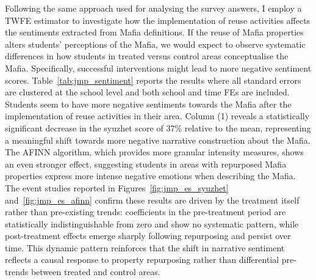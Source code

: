 \documentclass[12pt]{article}
\theoremstyle{plain}
\theoremstyle{plain}
\theoremstyle{plain}
\theoremstyle{definition}
\theoremstyle{plain}
\theoremstyle{definition}
\theoremstyle{plain}
\theoremstyle{remark}
\theoremstyle{definition}
\theoremstyle{definition}
\theoremstyle{plain}
\begin{document}
Following the same approach used for analysing the survey answers, I employ a TWFE estimator to investigate how the implementation of reuse activities affects the sentiments extracted from Mafia definitions.
If the reuse of Mafia properties alters students' perceptions of the Mafia, we would expect to observe systematic differences in how students in treated versus control areas conceptualise the Mafia. Specifically, successful interventions might lead to more negative sentiment scores. 
Table~\ref{tab:jmp_sentiment} reports the results where all standard errors are clustered at the school level and both school and time FEs are included. Students seem to have more negative sentiments towards the Mafia after the implementation of reuse activities in their area. Column (1) reveals a statistically significant decrease in the syuzhet score of 37\% relative to the mean, representing a meaningful shift towards more negative narrative construction about the Mafia. The AFINN algorithm, which provides more granular intensity measures, shows an even stronger effect, suggesting students in areas with repurposed Mafia properties express more intense negative emotions when describing the Mafia. The event studies reported in Figures~\ref{fig:jmp_es_syuzhet} and~\ref{fig:jmp_es_afinn} confirm these results are driven by the treatment itself rather than pre-existing trends: coefficients in the pre-treatment period are statistically indistinguishable from zero and show no systematic pattern, while post-treatment effects emerge sharply following repurposing and persist over time. This dynamic pattern reinforces that the shift in narrative sentiment reflects a causal response to property repurposing rather than differential pre-trends between treated and control areas.
\end{document}
